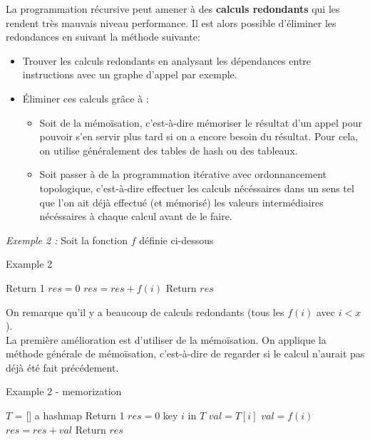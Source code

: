 \documentclass[
  paper=a4,
  ,captions=tableheading
]{scrartcl}
\providecommand{\tightlist}{%
  \setlength{\itemsep}{0pt}\setlength{\parskip}{0pt}}
\begin{document}
La programmation récursive peut amener à des \textbf{calculs redondants}
qui les rendent très mauvais niveau performance. Il est alors possible
d'éliminer les redondances en suivant la méthode suivante:

\begin{itemize}
\tightlist
\item
  Trouver les calculs redondants en analysant les dépendances entre
  instructions avec un graphe d'appel par exemple.\\
\item
  Éliminer ces calculs grâce à :

  \begin{itemize}
  \tightlist
  \item
    Soit de la mémoïsation, c'est-à-dire mémoriser le résultat d'un
    appel pour pouvoir s'en servir plus tard si on a encore besoin du
    résultat. Pour cela, on utilise généralement des tables de hash ou
    des tableaux.
  \item
    Soit passer à de la programmation itérative avec ordonnancement
    topologique, c'est-à-dire effectuer les calculs nécéssaires dans un
    sens tel que l'on ait déjà effectué (et mémorisé) les valeurs
    intermédiaires nécéssaires à chaque calcul avant de le faire.
  \end{itemize}
\end{itemize}

\emph{Exemple 2 :} Soit la fonction \(f\) définie ci-dessous

\begin{algorithm}[H]
\caption{Example 2}
\begin{algorithmic}[4]
      \State Return 1
    \EndIf
    \State $res = 0$
      \State $res = res + f(i)$
    \EndFor
  \State Return $res$
\EndFunction
\end{algorithmic}
\end{algorithm}

On remarque qu'il y a beaucoup de calculs redondants (tous les \(f(i)\)
avec \(i<x\)).\\
La première amélioration est d'utiliser de la mémoïsation. On applique
la méthode générale de mémoïsation, c'est-à-dire de regarder si le
calcul n'aurait pas déjà été fait précédement.

\begin{algorithm}[H]
\caption{Example 2 - memorization}
\begin{algorithmic}[5]
\Statex
\State $T$ = [] a hashmap
      \State Return 1
    \EndIf
    \State $res = 0$
      \If key $i$ in $T$
        \State $val = T[i]$
      \Else
        \State $val = f(i)$
      \EndIf
      \State $res = res + val$
    \EndFor
  \State Return $res$
  \EndFunction
\end{algorithmic}
\end{algorithm}
\end{document}
